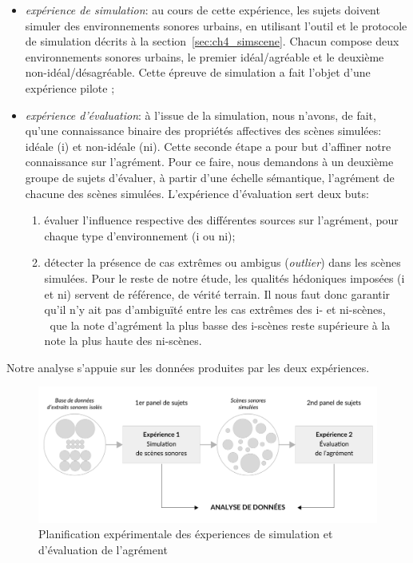 \begin{itemize}
\item \emph{expérience de simulation}: au cours de cette expérience, les sujets doivent simuler des environnements sonores urbains, en utilisant l'outil et le protocole de simulation décrits à la section~\ref{sec:ch4_simscene}. Chacun compose deux environnements sonores urbains, le premier idéal/agréable et le deuxième non-idéal/désagréable. Cette épreuve de simulation a fait l'objet d'une expérience pilote \citep{lafay2013atiam,lafay2014new}; 


\item \emph{expérience d'évaluation}: à l'issue de la simulation, nous n'avons, de fait, qu'une connaissance binaire des propriétés affectives des scènes simulées: idéale (i) et non-idéale (ni). Cette seconde étape a pour but d'affiner notre connaissance sur l'agrément. Pour ce faire, nous demandons à un deuxième groupe de sujets d'évaluer, à partir d'une échelle sémantique, l'agrément de chacune des scènes simulées. L'expérience d'évaluation sert deux buts:

\begin{enumerate}
\item évaluer l'influence respective des différentes sources sur l'agrément, pour chaque type d'environnement (i ou ni);
\item détecter la présence de cas extrêmes ou ambigus (\emph{outlier}) dans les scènes simulées. Pour le reste de notre étude, les qualités hédoniques imposées (i et ni) servent de référence, de vérité terrain. Il nous faut donc garantir qu'il n'y ait pas d’ambiguïté entre les cas extrêmes des i- et ni-scènes, \ie~que la note d'agrément la plus basse des i-scènes reste supérieure à la note la plus haute des ni-scènes.
\end{enumerate}

\end{itemize}

Notre analyse s'appuie sur les données produites par les deux expériences.

\begin{figure}[t]
        \myfloatalign
        \includegraphics[width=.8\linewidth]{gfx/ch_5/5}
        \caption{Planification expérimentale des éxperiences de simulation et d'évaluation de l'agrément}\label{fig:xp1_2}
\end{figure}

